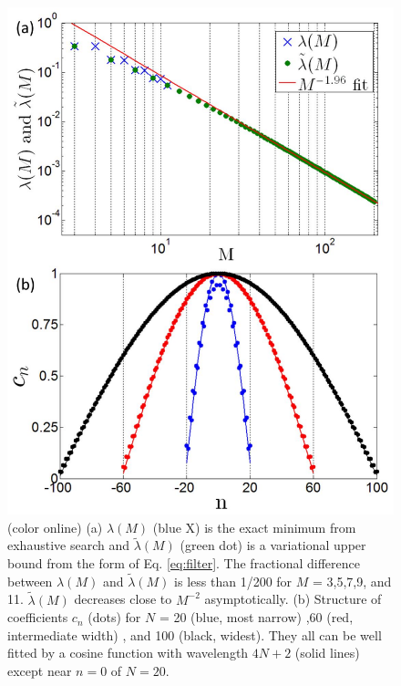\documentclass[twocolumn,superscriptaddress, prb]{revtex4-1}
\begin{document}
%


\begin{figure}
\includegraphics[width=0.95\linewidth]{fig_floquet.pdf}
\centering
\caption{(color online) (a) $\lambda(M)$ (blue X) is the exact minimum from exhaustive search and $\tilde{\lambda}(M)$ (green dot) is a variational upper bound from the form of Eq. \eqref{eq:filter}. The fractional difference between $\lambda(M)$ and $\tilde{\lambda}(M)$ is less than 1/200 for $M$ = 3,5,7,9, and 11. $\tilde{\lambda}(M)$ decreases close to $M^{-2}$ asymptotically. (b) Structure of coefficients $c_n$ (dots) for $N$ = 20 (blue, most narrow) ,60 (red, intermediate width) , and 100 (black, widest). They all can be well fitted by a cosine function with wavelength $4N+2$ (solid lines) except near $n = 0$ of $N = 20$. }
\label{fig:floquet}
\end{figure}
\end{document}
